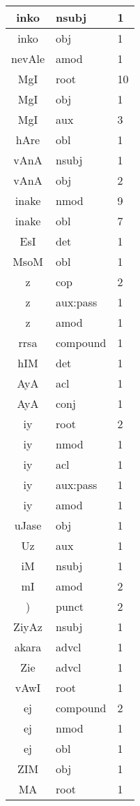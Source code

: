 \documentclass[a4 paper]{article}
\begin{document}
\begin{longtable}{cp{}p{}}
inko & nsubj & 1\\ \midrule inko & obj & 1\\ \midrule 
nevAle & amod & 1\\ \midrule 
MgI & root & 10\\ \midrule MgI & obj & 1\\ \midrule MgI & aux & 3\\ \midrule 
hAre & obl & 1\\ \midrule 
vAnA & nsubj & 1\\ \midrule vAnA & obj & 2\\ \midrule 
inake & nmod & 9\\ \midrule inake & obl & 7\\ \midrule 
EsI & det & 1\\ \midrule 
MsoM & obl & 1\\ \midrule 
z & cop & 2\\ \midrule z & aux:pass & 1\\ \midrule z & amod & 1\\ \midrule 
rrsa & compound & 1\\ \midrule 
hIM & det & 1\\ \midrule 
AyA & acl & 1\\ \midrule AyA & conj & 1\\ \midrule 
iy & root & 2\\ \midrule iy & nmod & 1\\ \midrule iy & acl & 1\\ \midrule iy & aux:pass & 1\\ \midrule iy & amod & 1\\ \midrule 
uJase & obj & 1\\ \midrule 
Uz & aux & 1\\ \midrule 
iM & nsubj & 1\\ \midrule 
mI & amod & 2\\ \midrule 
) & punct & 2\\ \midrule 
ZiyAz & nsubj & 1\\ \midrule 
akara & advcl & 1\\ \midrule 
Zie & advcl & 1\\ \midrule 
vAwI & root & 1\\ \midrule 
ej & compound & 2\\ \midrule ej & nmod & 1\\ \midrule ej & obl & 1\\ \midrule 
ZIM & obj & 1\\ \midrule 
MA & root & 1\\ \midrule 

\end{longtable}
\end{document}
